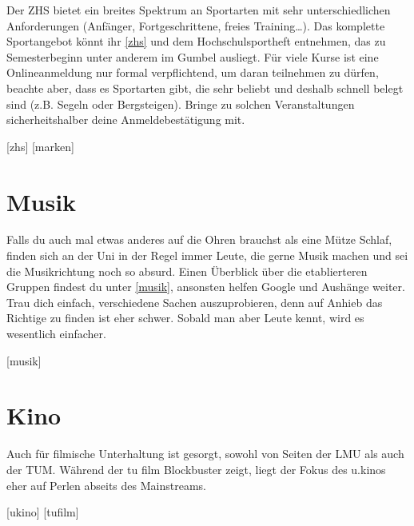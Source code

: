 Der ZHS bietet ein breites Spektrum an Sportarten mit sehr unterschiedlichen
Anforderungen (Anfänger, Fortgeschrittene, freies Training\ldots). Das
komplette Sportangebot könnt ihr \ref{zhs} und dem Hochschulsportheft
entnehmen, das zu Semesterbeginn unter anderem im Gumbel ausliegt. Für viele
Kurse ist eine Onlineanmeldung nur formal verpflichtend, um daran teilnehmen zu
dürfen, beachte aber, dass es Sportarten gibt, die sehr beliebt und deshalb
schnell belegt sind (z.B. Segeln oder Bergsteigen). Bringe zu solchen
Veranstaltungen sicherheitshalber deine Anmeldebestätigung mit.

\begin{urlList}
	[zhs]
	[marken]
\end{urlList}

\section{Musik}
Falls du auch mal etwas anderes auf die Ohren brauchst als eine
Mütze Schlaf, finden sich an der Uni in der Regel immer Leute, die gerne Musik
machen und sei die Musikrichtung noch so absurd. Einen Überblick über die
etablierteren Gruppen findest du unter \ref{musik}, ansonsten helfen Google und
Aushänge weiter. Trau dich einfach, verschiedene Sachen auszuprobieren, denn
auf Anhieb das Richtige zu finden ist eher schwer. Sobald man aber Leute kennt,
wird es wesentlich einfacher.

\begin{urlList}
	[musik]
\end{urlList}

\section{Kino}
Auch für filmische Unterhaltung ist gesorgt, sowohl von Seiten der LMU als auch
der TUM. Während der tu film Blockbuster zeigt, liegt der Fokus des u.kinos
eher auf Perlen abseits des Mainstreams.

\begin{urlList}
	[ukino]
	[tufilm]
\end{urlList}

